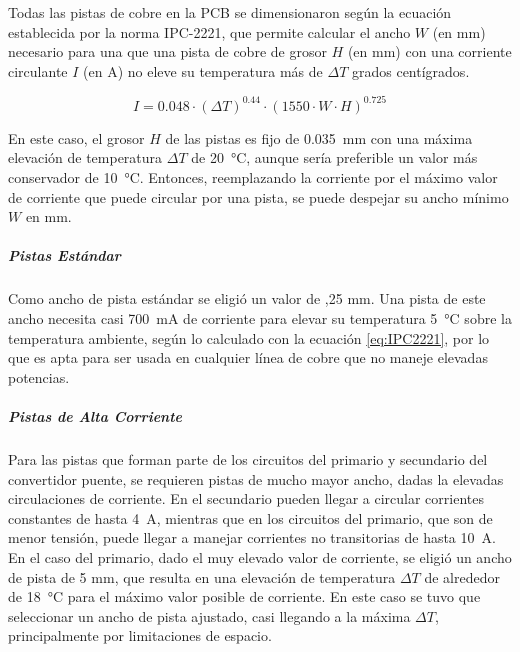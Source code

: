Todas las pistas de cobre en la PCB se dimensionaron según la ecuación establecida por la {\Medium norma IPC-2221}, que permite calcular el ancho $W$ (en \unit{\milli\metre}) necesario para una que una pista de cobre de grosor $H$ (en \unit{\milli\metre}) con una corriente circulante $I$ (en \unit{\ampere}) no eleve su temperatura más de $\Delta T$ grados centígrados.

\begin{equation}\label{eq:IPC2221}
    I = \num{0.048}\cdot (\Delta T)^{\num{0.44}}\cdot (\num{1550}\cdot W\cdot H)^{\num{0.725}}
\end{equation}

En este caso, el grosor $H$ de las pistas es fijo de \SI[]{0.035}[]{\milli\metre} con una máxima elevación de temperatura $\Delta T$ de \SI[]{20}[]{\celsius}, aunque sería preferible un valor más conservador de \SI[]{10}{\celsius}. Entonces, reemplazando la corriente por el máximo valor de corriente que puede circular por una pista, se puede despejar su ancho mínimo $W$ en \unit{\milli\metre}.\\

\subparagraph{Pistas Estándar}

Como ancho de pista estándar se eligió un valor de {,25 mm}. Una pista de este ancho necesita casi \SI[]{700}{\milli\ampere} de corriente para elevar su temperatura \SI[]{5}{\celsius} sobre la temperatura ambiente, según lo calculado con la ecuación \ref{eq:IPC2221}, por lo que es apta para ser usada en cualquier línea de cobre que no maneje elevadas potencias.\\

\subparagraph{Pistas de Alta Corriente}

Para las pistas que forman parte de los circuitos del primario y secundario del convertidor puente, se requieren pistas de mucho mayor ancho, dadas la elevadas circulaciones de corriente. En el secundario pueden llegar a circular corrientes constantes de hasta \SI{4}{\ampere}, mientras que en los circuitos del primario, que son de menor tensión, puede llegar a manejar corrientes no transitorias de hasta \SI{10}{\ampere}.\\

En el caso del {\Medium primario}, dado el muy elevado valor de corriente, se eligió un {\Medium ancho de pista de 5 mm}, que resulta en una elevación de temperatura $\Delta T$ de alrededor de \SI[]{18}{\celsius} para el máximo valor posible de corriente. En este caso se tuvo que seleccionar un ancho de pista ajustado, casi llegando a la máxima $\Delta T$, principalmente por limitaciones de espacio.\\

